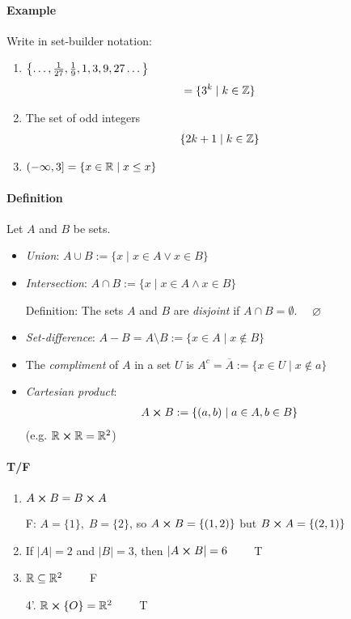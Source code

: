 \documentclass[../main.tex]{subfiles}
\begin{document}
\paragraph{Example} Write in set-builder notation:

\begin{enumerate}
    \item \(\qt{\dots, \frac{1}{27}, \frac{1}{9}, 1, 3, 9, 27 \dots}\)
    \begin{align*}
        = \{3^k \; | \; k \in \mathbb{Z}\}
    \end{align*}
    \item The set of odd integers
    \begin{align*}
        \{2k + 1 \; | \; k \in \mathbb{Z}\}
    \end{align*}
    \item $(-\infty, 3] = \{x \in \mathbb{R} \; | \; x \leq x\}$
\end{enumerate}

\paragraph{Definition} Let $A$ and $B$ be sets.

\begin{itemize}
    \item \emph{Union}: $A \cup B := \{x \mid x \in A \lor x \in B\}$

    \item \emph{Intersection}: $A \cap B := \{x \mid x \in A \land x \in B\}$
    
    Definition: The sets $A$ and $B$ are \emph{disjoint} if $A \cap B = \emptyset$. $\quad \varnothing$

    \item \emph{Set-difference}: $A - B = A \setminus B := \{x \in A \mid x \notin B\}$
    
    \item The \emph{compliment} of $A$ in a set $U$ is
    $A^c = \overline{A} := \{x \in U \mid x \notin a\}$

    \item \emph{Cartesian product}:
    \begin{align*}
        A \cross B := \{(a, b) \mid a \in A, b \in B\}
    \end{align*}
    (e.g. $\mathbb{R} \cross \mathbb{R} = \mathbb{R}^2$)
\end{itemize}

\paragraph{T/F}
\begin{enumerate}
    \item $A \cross B = B \cross A \qquad$

    F: $A = \{1\}, \; B = \{2\}$, so $A \cross B = \{(1, 2)\}$ but $B \cross A = \{(2, 1)\}$
    \item If $|A| = 2$ and $|B| = 3$, then $|A \cross B| = 6 \qquad$ T
    \item $\mathbb{R} \subseteq \mathbb{R}^2 \qquad$ F
    \item [4'.] $\mathbb{R} \cross \{O\} = \mathbb{R}^2 \qquad$ T
\end{enumerate}
\end{document}
